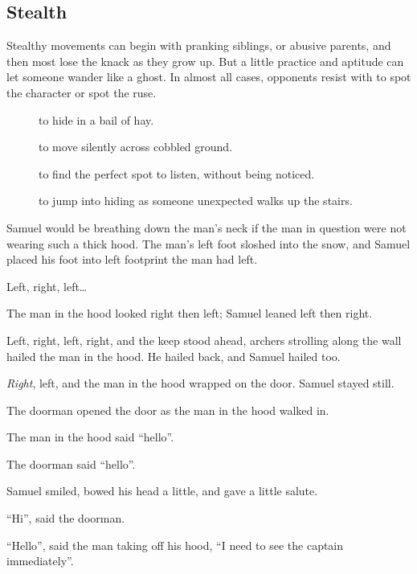 \begin{multicols}{2}
\begin{exampletext}
\end{exampletext}

\subsection{Stealth}

Stealthy movements can begin with pranking siblings, or abusive parents, and then most lose the knack as they grow up.
But a little practice and aptitude can let someone wander like a ghost.
In almost all cases, opponents resist with  to spot the character or spot the ruse.

\begin{description}
  \item[]
    to hide in a bail of hay.
  \item[]
    to move silently across cobbled ground.
  \item[]
    to find the perfect spot to listen, without being noticed.
  \item[]
    to jump into hiding as someone unexpected walks up the stairs.
\end{description}

\begin{exampletext}
  Samuel would be breathing down the man's neck if the man in question were not wearing such a thick hood.
  The man's left foot sloshed into the snow, and Samuel placed his foot into left footprint the man had left.

  Left, right, left\ldots

  The man in the hood looked right then left; Samuel leaned left then right.

  Left, right, left, right, and the keep stood ahead, archers strolling along the wall hailed the man in the hood.
  He hailed back, and Samuel hailed too.

  \emph{Right}, left, and the man in the hood wrapped on the door.
  Samuel stayed still.

  The doorman opened the door as the man in the hood walked in.

  The man in the hood said ``hello''.

  The doorman said ``hello''.

  Samuel smiled, bowed his head a little, and gave a little salute.

  ``Hi'', said the doorman.

  ``Hello'', said the man taking off his hood, ``I need to see the captain immediately''.


\end{exampletext}
\end{multicols}
